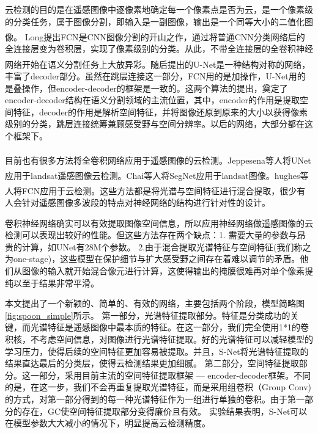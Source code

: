 \documentclass[10pt]{ctexart}
\newcommand{\upcite}[1]{\textsuperscript{\textsuperscript{\cite{#1}}}}
\begin{document}
\begin{multicols}{2}
云检测的目的是在遥感图像中逐像素地确定每一个像素点是否为云，是一个像素级的分类任务，属于图像分割，即输入是一副图像，输出是一个同等大小的二值化图像。
Long提出FCN\upcite{FCN}是CNN图像分割的开山之作，通过将普通CNN分类网络后的全连接层变为卷积层，实现了像素级别的分类。从此，不带全连接层的全卷积神经网络开始在语义分割任务上大放异彩。随后提出的U-Net\upcite{ronneberger2015unet}是一种结构对称的网络，丰富了decoder部分。虽然在跳层连接这一部分，FCN用的是加操作，U-Net用的是叠操作，但encoder-decoder的框架是一致的。这两个算法的提出，奠定了encoder-decoder结构在语义分割领域的主流位置，其中，encoder的作用是提取空间特征，decoder的作用是解析空间特征，并将图像还原到原来的大小以获得像素级别的分类，跳层连接统筹兼顾感受野与空间分辨率。以后的网络，大部分都在这个框架下。




目前也有很多方法将全卷积网络应用于遥感图像的云检测。Jeppesena等人\upcite{jeppesen2019cloud}将UNet应用于landsat遥感图像云检测。Chai等人\upcite{chai2019cloud}将SegNet应用于landsat图像。hughes等人\upcite{hughes2019high}将FCN应用于云检测。这些方法都是将光谱与空间特征进行混合提取，很少有人会针对遥感图像多波段的特点对神经网络的结构进行针对性的设计。

卷积神经网络确实可以有效提取图像空间信息，所以应用神经网络做遥感图像的云检测可以表现出较好的性能。但这些方法存在两个缺点：1. 需要大量的参数与昂贵的计算，如UNet有28M个参数。 2.由于混合提取光谱特征与空间特征(我们称之为one-stage)，这些模型在保护细节与扩大感受野之间存在着难以调节的矛盾。他们从图像的输入就开始混合像元进行计算，这使得输出的掩膜很难再对单个像素提纯以至于结果非常平滑。

本文提出了一个新颖的、简单的、有效的网络，主要包括两个阶段，模型简略图\ref{fig:spoon_simple}所示。
第一部分，光谱特征提取部分。特征是分类成功的关键，而光谱特征是遥感图像中最本质的特征。在这一部分，我们完全使用1*1的卷积核，不考虑空间信息，对图像进行光谱特征提取。好的光谱特征可以减轻模型的学习压力，使得后续的空间特征更加容易被提取。并且，S-Net将光谱特征提取的结果直达最后的分类层，使得云检测结果更加细腻。
第二部分，空间特征提取部分。这一部分，采用目前主流的空间特征提取框架 --- encoder-decoder框架。不同的是，在这一步，我们不会再重复提取光谱特征，而是采用组卷积（Group Conv)的方式，对第一部分得到的每一种光谱特征作为一组进行单独的卷积。由于第一部分的存在，GC使空间特征提取部分变得廉价且有效。
实验结果表明，S-Net可以在模型参数大大减小的情况下，明显提高云检测精度。


\end{multicols}
\end{document}
